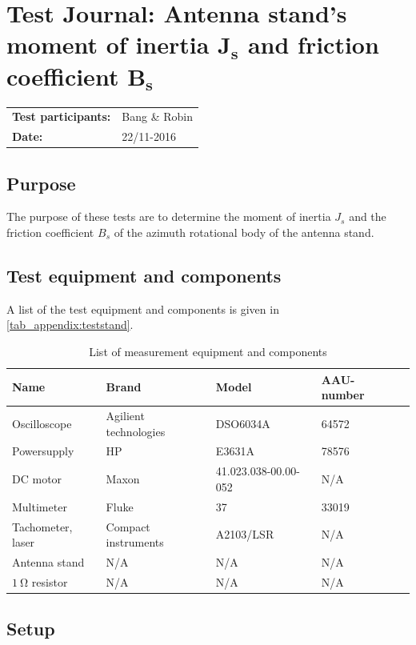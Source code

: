 \chapter{Test Journal: Antenna stand's moment of inertia $\boldsymbol{J_s}$ and friction coefficient $\boldsymbol{B_s}$}\label{appendix:TJStandConstants}
\begin{table}[!h]
\begin{tabular}{l l}
\textbf{Test participants:} & Bang \& Robin\\
\textbf{Date:}  & 22/11-2016
\end{tabular}
\end{table}

\section*{Purpose}
The purpose of these tests are to determine the moment of inertia $J_s$ and the friction coefficient $B_s$ of the azimuth rotational body of the antenna stand.
\section*{Test equipment and components}
A list of the test equipment and components is given in \autoref{tab_appendix:teststand}.
\begin{table}[!h]
	\centering
	\caption{List of measurement equipment and components}

	\begin{tabularx}{\textwidth}{lXXXX}
		Name 				& Brand	& Model & AAU-number\\ \toprule \rowcolor{lightGrey}
		Oscilloscope	& Agilient technologies & DSO6034A & 64572	\\
		Powersupply	& HP & E3631A & 78576\\ \rowcolor{lightGrey}
		DC motor & Maxon & 41.023.038-00.00-052& N/A \\ 
		Multimeter & Fluke & 37 & 33019\\\rowcolor{lightGrey}
		Tachometer, laser & Compact instruments & A2103/LSR & N/A\\
		Antenna stand & N/A & N/A & N/A \\\rowcolor{lightGrey}
		$\SI{1}{\ohm}$ resistor	& N/A & N/A & N/A
	\end{tabularx}
\end{table}\label{tab_appendix:teststand}
\section*{Setup}

